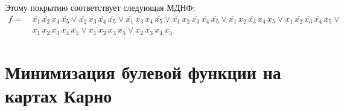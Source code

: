 \documentclass{article}
\begin{document}
Этому покрытию соответствует следующая МДНФ:
\[\begin{aligned}f = & \: \overline{x_{1}} \, \overline{x_{2}} \, x_{4} \, \overline{x_{5}} \lor \overline{x_{2}} \, x_{3} \, \overline{x_{4}} \, \overline{x_{5}} \lor \overline{x_{1}} \, x_{3} \, x_{4} \, \overline{x_{5}} \lor \overline{x_{1}} \, x_{2} \, \overline{x_{3}} \, \overline{x_{4}} \, \overline{x_{5}} \lor \overline{x_{1}} \, x_{2} \, \overline{x_{3}} \, x_{4} \, x_{5} \lor x_{1} \, \overline{x_{2}} \, \overline{x_{3}} \, \overline{x_{4}} \, x_{5} \lor \\ & \: x_{1} \, x_{2} \, \overline{x_{3}} \, x_{4} \, \overline{x_{5}} \lor x_{1} \, x_{2} \, x_{3} \, x_{5} \lor \overline{x_{2}} \, x_{3} \, x_{4} \, x_{5}\end{aligned}\]
\section*{Минимизация булевой функции на картах Карно}
\end{document}
